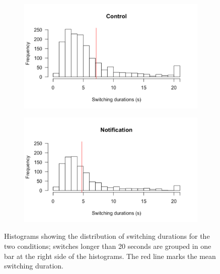 \begin{figure}
\centering
\begin{subfigure}{0.5\textwidth}
\centerline{\includegraphics[scale=0.5]{images/ch56/ch56-histdurSwitches_Control.pdf}}
\end{subfigure}
\begin{subfigure}{0.5\textwidth}
\centerline{\includegraphics[scale=0.5]{images/ch56/ch56-histdurSwitches_Not.pdf}}
\end{subfigure}
\caption[Study 6 distribution of switching durations]{Histograms showing the distribution of switching durations for the two conditions; switches longer than 20 seconds are grouped in one bar at the right side of the histograms. The red line marks the mean switching duration.}
\label{fig:ch56-histswitches}
\end{figure}


